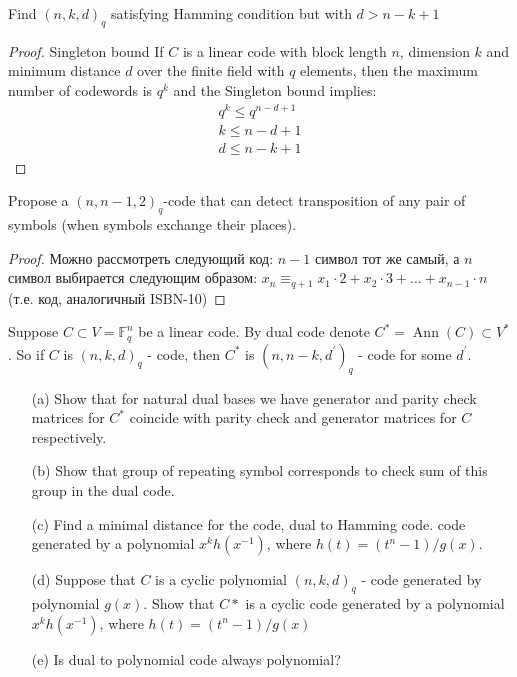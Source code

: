 \begin{prob}
    Find $(n, k, d)_q$ satisfying Hamming condition but with $d>n-k+1$
\end{prob}

\begin{proof}
    Singleton bound
    If $C$ is a linear code with block length $n$, dimension $k$ and minimum distance $d$ over the finite field with $q$ elements, then the maximum number of codewords is $q^{k}$ and the Singleton bound implies:
    \begin{gather*}
        q^k \leq q^{n-d+1}\\
        k \leq n - d + 1\\
        d \leq n - k + 1
    \end{gather*}
\end{proof}
\vskip 0.4in





\begin{prob}
    Propose a $(n, n-1,2)_q$-code that can detect transposition of any pair of symbols (when symbols exchange their places).
\end{prob}

\begin{proof}
    Можно рассмотреть следующий код: $n-1$ символ тот же самый, а $n$ символ выбирается следующим образом:
    $x_n \equiv_{q+1} x_1 \cdot 2 + x_2 \cdot 3 + \ldots + x_{n-1} \cdot n$ (т.е. код, аналогичный ISBN-10)
\end{proof}
\vskip 0.4in





\begin{prob}
    Suppose $C \subset V=\mathbb{F}_q^n$ be a linear code. By dual code denote $C^*=\operatorname{Ann}(C) \subset V^*$. So if $C$ is $(n, k, d)_{q}$ - code, then $C^*$ is $\left(n, n-k, d^{\prime}\right)_q$ - code for some $d^{\prime}$.
    \begin{itemize}
        \item[(a)] Show that for natural dual bases we have generator and parity check matrices for $C^*$ coincide with parity check and generator matrices for $C$ respectively.
        \item[(b)] Show that group of repeating symbol corresponds to check sum of this group in the dual code.
        \item[(c)] Find a minimal distance for the code, dual to Hamming code. code generated by a polynomial $x^k h\left(x^{-1}\right)$, where $h(t)=\left(t^n-1\right) / g(x)$.
        \item[(d)] Suppose that $C$ is a cyclic polynomial $(n, k, d)_{q}$ - code generated by polynomial $g(x)$. Show that $C*$ is a cyclic code generated by a polynomial $x^k h(x^{-1})$, where $h(t) = (t^n - 1)/g(x)$
        \item[(e)] Is dual to polynomial code always polynomial?
    \end{itemize}
\end{prob}

